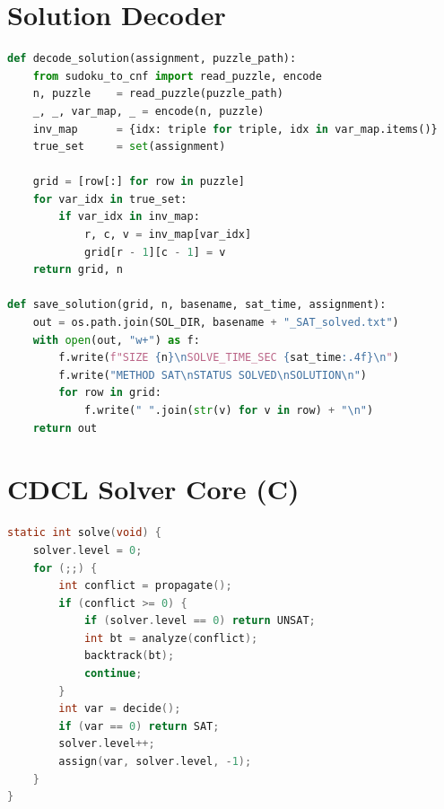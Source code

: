 \documentclass[12pt]{article}
\begin{document}
\section{Solution Decoder}
\label{app:decoder}
\begin{lstlisting}[language=Python, caption={Decoding SAT assignment back to grid}]
def decode_solution(assignment, puzzle_path):
    from sudoku_to_cnf import read_puzzle, encode
    n, puzzle    = read_puzzle(puzzle_path)
    _, _, var_map, _ = encode(n, puzzle)
    inv_map      = {idx: triple for triple, idx in var_map.items()}
    true_set     = set(assignment)

    grid = [row[:] for row in puzzle]
    for var_idx in true_set:
        if var_idx in inv_map:
            r, c, v = inv_map[var_idx]
            grid[r - 1][c - 1] = v
    return grid, n

def save_solution(grid, n, basename, sat_time, assignment):
    out = os.path.join(SOL_DIR, basename + "_SAT_solved.txt")
    with open(out, "w+") as f:
        f.write(f"SIZE {n}\nSOLVE_TIME_SEC {sat_time:.4f}\n")
        f.write("METHOD SAT\nSTATUS SOLVED\nSOLUTION\n")
        for row in grid:
            f.write(" ".join(str(v) for v in row) + "\n")
    return out
\end{lstlisting}


\section{CDCL Solver Core (C)}
\label{app:cdcl}
\begin{lstlisting}[language=C, caption={Core CDCL solve loop}]
static int solve(void) {
    solver.level = 0;
    for (;;) {
        int conflict = propagate();
        if (conflict >= 0) {
            if (solver.level == 0) return UNSAT;
            int bt = analyze(conflict);
            backtrack(bt);
            continue;
        }
        int var = decide();
        if (var == 0) return SAT;
        solver.level++;
        assign(var, solver.level, -1);
    }
}
\end{lstlisting}
\end{document}
